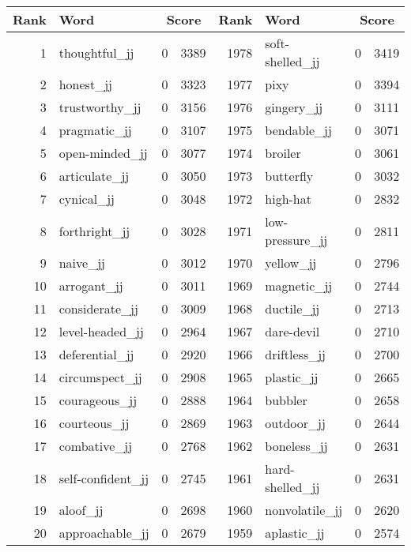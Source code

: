 \begin{table}[tbp]
    \begin{tabular}{| rlr@{.}l | rlr@{.}l |}
    \hline
    \textbf{Rank} & \textbf{Word} & \multicolumn{2}{c|}{\textbf{Score}} & \textbf{Rank} & \textbf{Word} & \multicolumn{2}{c|}{\textbf{Score}} \\
    \hline
    1 & thoughtful\_jj & 0 & 3389    &    1978 & soft-shelled\_jj & 0 & 3419 \\
    2 & honest\_jj & 0 & 3323    &    1977 & pixy & 0 & 3394 \\
    3 & trustworthy\_jj & 0 & 3156    &    1976 & gingery\_jj & 0 & 3111 \\
    4 & pragmatic\_jj & 0 & 3107    &    1975 & bendable\_jj & 0 & 3071 \\
    5 & open-minded\_jj & 0 & 3077    &    1974 & broiler & 0 & 3061 \\
    6 & articulate\_jj & 0 & 3050    &    1973 & butterfly & 0 & 3032 \\
    7 & cynical\_jj & 0 & 3048    &    1972 & high-hat & 0 & 2832 \\
    8 & forthright\_jj & 0 & 3028    &    1971 & low-pressure\_jj & 0 & 2811 \\
    9 & naive\_jj & 0 & 3012    &    1970 & yellow\_jj & 0 & 2796 \\
    10 & arrogant\_jj & 0 & 3011    &    1969 & magnetic\_jj & 0 & 2744 \\
    11 & considerate\_jj & 0 & 3009    &    1968 & ductile\_jj & 0 & 2713 \\
    12 & level-headed\_jj & 0 & 2964    &    1967 & dare-devil & 0 & 2710 \\
    13 & deferential\_jj & 0 & 2920    &    1966 & driftless\_jj & 0 & 2700 \\
    14 & circumspect\_jj & 0 & 2908    &    1965 & plastic\_jj & 0 & 2665 \\
    15 & courageous\_jj & 0 & 2888    &    1964 & bubbler & 0 & 2658 \\
    16 & courteous\_jj & 0 & 2869    &    1963 & outdoor\_jj & 0 & 2644 \\
    17 & combative\_jj & 0 & 2768    &    1962 & boneless\_jj & 0 & 2631 \\
    18 & self-confident\_jj & 0 & 2745    &    1961 & hard-shelled\_jj & 0 & 2631 \\
    19 & aloof\_jj & 0 & 2698    &    1960 & nonvolatile\_jj & 0 & 2620 \\
    20 & approachable\_jj & 0 & 2679    &    1959 & aplastic\_jj & 0 & 2574 \\

\end{tabular}
\end{table}
